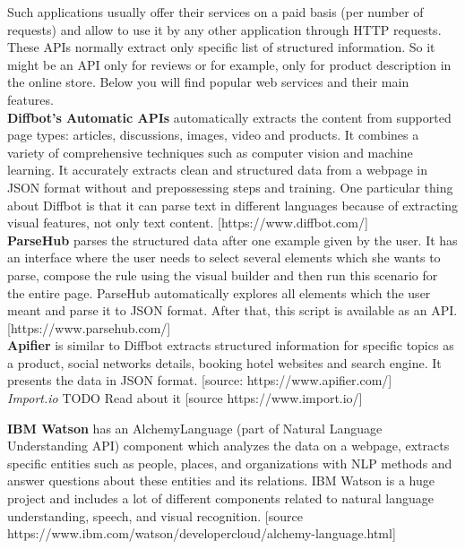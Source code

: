 Such applications usually offer their services on a paid basis (per number of requests) and allow to use it by any other application through HTTP requests. These APIs normally extract only specific list of structured information. So it might be an API only for reviews or for example, only for product description in the online store. Below you will find popular web services and their main features.\\

\noindent \textbf{Diffbot's Automatic APIs} automatically extracts the content from supported page types: articles, discussions, images, video and products. It combines a variety of comprehensive techniques such as computer vision and machine learning. It accurately extracts clean and structured data from a webpage in JSON format without and prepossessing steps and training. One particular thing about Diffbot is that it can parse text in different languages because of extracting visual features, not only text content. [https://www.diffbot.com/]\\

\noindent\textbf{ParseHub} parses the structured data after one example given by the user. It has an interface where the user needs to select several elements which she wants to parse, compose the rule using the visual builder and then run this scenario for the entire page. ParseHub automatically explores all elements which the user meant and parse it to JSON format. After that, this script is available as an API.    
[https://www.parsehub.com/]\\

\noindent\textbf{Apifier} is similar to Diffbot extracts structured information for specific topics as a product, social networks details, booking hotel websites and search engine. It presents the data in JSON format. 
[source: https://www.apifier.com/] \\

\noindent\textit{Import.io} TODO Read about it
[source https://www.import.io/]

\noindent \textbf{IBM Watson} has an AlchemyLanguage (part of Natural Language Understanding API) component which analyzes the data on a webpage, extracts specific entities such as people, places, and organizations with NLP methods and answer questions about these entities and its relations. IBM Watson is a huge project and includes a lot of different components related to natural language understanding, speech, and visual recognition.     
[source https://www.ibm.com/watson/developercloud/alchemy-language.html] \\

